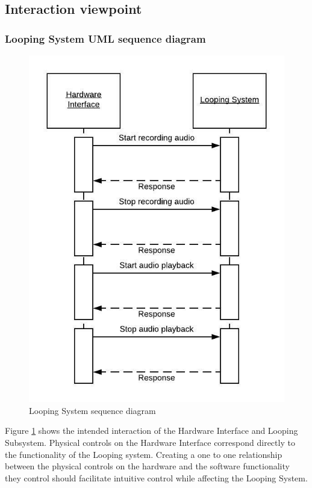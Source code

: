 \subsection{Interaction viewpoint}
    

    \subsubsection{Looping System UML sequence diagram}
        \begin{figure}[!ht]
            \centering
            \includegraphics{diagrams/looping-interaction.jpeg}
            \caption{Looping System sequence diagram}
            \label{fig:looping}
        \end{figure}
       Figure \ref{fig:looping} shows the intended interaction of the Hardware Interface and Looping Subsystem. Physical controls on the Hardware Interface correspond directly to the functionality of the Looping system. Creating a one to one relationship between the physical controls on the hardware and the software functionality they control should facilitate intuitive control while affecting the Looping System.
       
